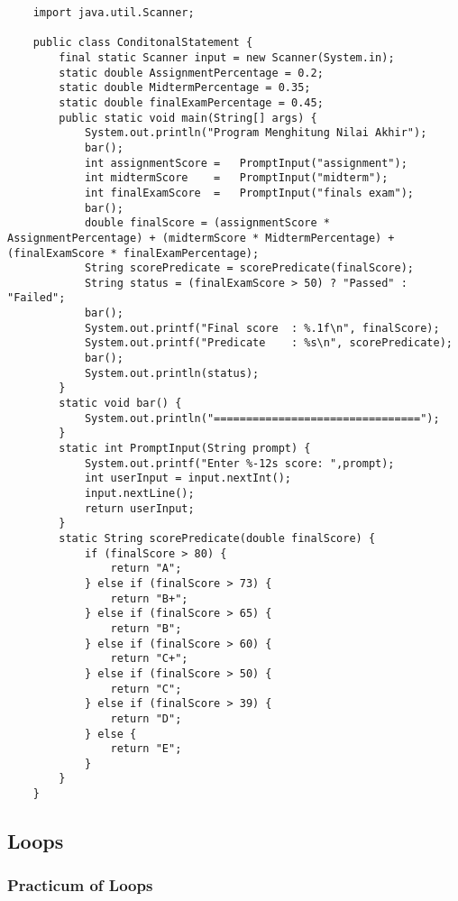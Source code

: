 \documentclass[12pt,titlepage]{article}
\begin{document}
\begin{verbatim}
    import java.util.Scanner;

    public class ConditonalStatement {
        final static Scanner input = new Scanner(System.in);
        static double AssignmentPercentage = 0.2;
        static double MidtermPercentage = 0.35;
        static double finalExamPercentage = 0.45;
        public static void main(String[] args) {
            System.out.println("Program Menghitung Nilai Akhir");
            bar();
            int assignmentScore =   PromptInput("assignment");
            int midtermScore    =   PromptInput("midterm");
            int finalExamScore  =   PromptInput("finals exam");
            bar();
            double finalScore = (assignmentScore * AssignmentPercentage) + (midtermScore * MidtermPercentage) + (finalExamScore * finalExamPercentage);
            String scorePredicate = scorePredicate(finalScore);
            String status = (finalExamScore > 50) ? "Passed" : "Failed"; 
            bar();
            System.out.printf("Final score  : %.1f\n", finalScore);
            System.out.printf("Predicate    : %s\n", scorePredicate);
            bar();
            System.out.println(status);
        }
        static void bar() {
            System.out.println("================================");
        }
        static int PromptInput(String prompt) {
            System.out.printf("Enter %-12s score: ",prompt);
            int userInput = input.nextInt();
            input.nextLine();
            return userInput;
        }
        static String scorePredicate(double finalScore) {
            if (finalScore > 80) {
                return "A";
            } else if (finalScore > 73) {
                return "B+";
            } else if (finalScore > 65) {
                return "B";
            } else if (finalScore > 60) {
                return "C+";
            } else if (finalScore > 50) {
                return "C";
            } else if (finalScore > 39) {
                return "D";
            } else {
                return "E";
            }
        }
    }
\end{verbatim}

\subsection{Loops}

\subsubsection{Practicum of Loops}
\end{document}
